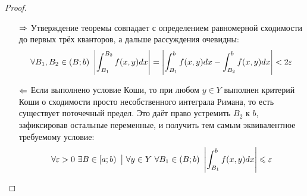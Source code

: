 \begin{proof}~
	\begin{itemize}
		\item[$\Rightarrow$] Утверждение теоремы совпадает с определением равномерной сходимости до первых трёх кванторов, а дальше рассуждения очевидны:
		\[
			\forall B_1, B_2 \in (B; b) \ \left|\int_{B_1}^{B_2} f(x, y)dx\right| = \left|\int_{B_1}^b f(x, y)dx - \int_{B_2}^b f(x, y)dx\right| < 2\varepsilon
		\]
		\item[$\Leftarrow$] Если выполнено условие Коши, то при любом $y \in Y$ выполнен критерий Коши о сходимости просто несобственного интеграла Римана, то есть существует поточечный предел. Это даёт право устремить $B_2$ к $b$, зафиксировав остальные переменные, и получить тем самым эквивалентное требуемому условие:
		\[
			\forall \eps > 0\ \exists B \in \lsi{a; b} \such \forall y \in Y\ \forall B_1 \in (B; b) \ \md{\int_{B_1}^b f(x, y)dx} \le \eps
		\]
	\end{itemize}
\end{proof}